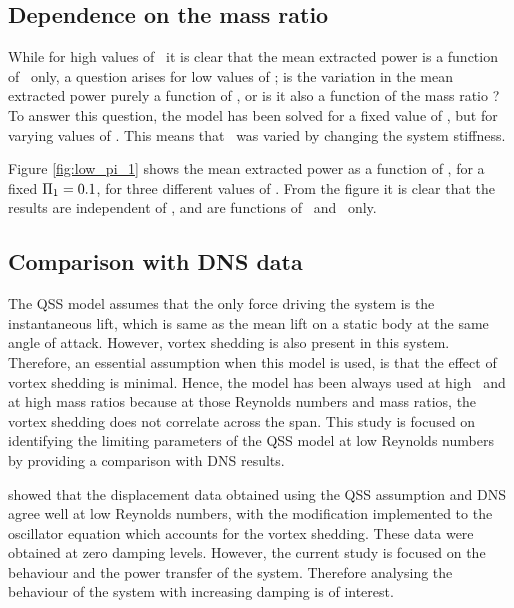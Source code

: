 \subsection{Dependence on the mass ratio \mstar}
\label{sec:mstar}
While for high values of \massstiff\ it is clear that the mean extracted power is a function of \massdamp\ only, a question arises for low values of \massstiff; is the variation in the mean extracted power purely a function of \massstiff, or is it also a function of the mass ratio \mstar? To answer this question, the model has been solved for a fixed value of \massstiff, but for varying values of \mstar. This means that \massstiff\ was varied by changing the system stiffness.

Figure \ref{fig:low_pi_1} shows the mean extracted power as a function of \massdamp, for a fixed $\Pi_1 = 0.1$, for three different values of \mstar. From the figure it is clear that the results are independent of \mstar, and are functions of \massstiff\ and \massdamp\ only.



\subsection{Comparison with DNS data}
\label{sec:dns}

The QSS model assumes that the only force driving the system is the instantaneous lift, which is same as the mean lift on a static body at the same angle of attack. However, vortex shedding is also present in this system. Therefore, an essential assumption when this model is used, is that the effect of vortex shedding is minimal. Hence, the model has been always used at high \reynoldsnumber \ and  at high mass ratios because at those Reynolds numbers and mass ratios, the vortex shedding does not correlate across the span. This study is focused on identifying the limiting parameters of the QSS model at low Reynolds numbers by providing a comparison with DNS results. 

\citet{Joly2012} showed that the displacement data obtained using the QSS assumption and DNS agree well at low Reynolds numbers, with the modification implemented to the oscillator equation which accounts for the vortex shedding. These data were obtained at zero damping levels. However, the current study is focused on the behaviour and the power transfer of the system. Therefore analysing the behaviour of the system with increasing damping is of interest.

